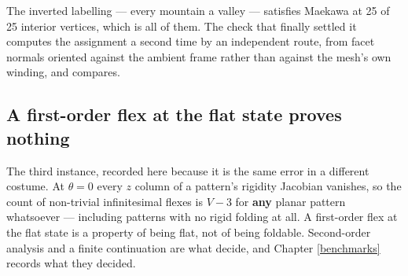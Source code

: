 \documentclass[
  british,
  a4paper,
]{book}
\newenvironment{Shaded}{\begin{snugshade}}{\end{snugshade}}
\newcommand{\ControlFlowTok}[1]{\textcolor[rgb]{0.13,0.29,0.53}{\textbf{#1}}}
\newcommand{\DecValTok}[1]{\textcolor[rgb]{0.00,0.00,0.81}{#1}}
\newcommand{\FunctionTok}[1]{\textcolor[rgb]{0.13,0.29,0.53}{\textbf{#1}}}
\newcommand{\NormalTok}[1]{#1}
\newcommand{\OtherTok}[1]{\textcolor[rgb]{0.56,0.35,0.01}{#1}}
\newcommand{\SpecialCharTok}[1]{\textcolor[rgb]{0.81,0.36,0.00}{\textbf{#1}}}
\newcommand{\StringTok}[1]{\textcolor[rgb]{0.31,0.60,0.02}{#1}}
\begin{document}
\begin{Shaded}
\end{Shaded}

The inverted labelling --- every mountain a valley --- satisfies Maekawa at
25 of 25 interior vertices, which is all of
them. The check that finally settled it computes the assignment a second time by
an independent route, from facet normals oriented against the ambient frame
rather than against the mesh's own winding, and compares.

\subsection{A first-order flex at the flat state proves nothing}\label{a-first-order-flex-at-the-flat-state-proves-nothing}

The third instance, recorded here because it is the same error in a different
costume. At \(\theta = 0\) every \(z\) column of a pattern's rigidity Jacobian
vanishes, so the count of non-trivial infinitesimal flexes is \(V - 3\) for \textbf{any}
planar pattern whatsoever --- including patterns with no rigid folding at all. A
first-order flex at the flat state is a property of being flat, not of being
foldable. Second-order analysis and a finite continuation are what decide, and
Chapter \ref{benchmarks} records what they decided.
\end{document}

